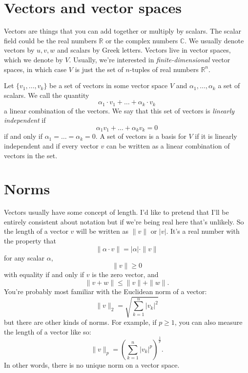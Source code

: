 \documentclass{article}
\theoremstyle{definition}
\theoremstyle{plain}
\begin{document}
\section{Vectors and vector spaces}

Vectors are things that you can add together or multiply by scalars.
The scalar field could be the real numbers $\mathbb{R}$ or the complex numbers $\mathbb{C}$.
We usually denote vectors by $u, v, w$ and scalars by Greek letters.
Vectors live in vector spaces, which we denote by $V$.
Usually, we're interested in \emph{finite-dimensional} vector spaces, in which case $V$ is just the set of $n$-tuples of real numbers $\mathbb{R}^n$.

Let $\{v_1, \ldots, v_k\}$ be a set of vectors in some vector space $V$ and $\alpha_1, \ldots, \alpha_k$ a set of scalars.
We call the quantity
\begin{equation}
    \alpha_1\cdot v_1 + \ldots + \alpha_k\cdot v_k
\end{equation}
a linear combination of the vectors.
We say that this set of vectors is \emph{linearly independent} if
\begin{equation}
    \alpha_1v_1 + \ldots + \alpha_kv_k = 0
\end{equation}
if and only if $\alpha_1 = \ldots = \alpha_k = 0$.
A set of vectors is a basis for $V$ if it is linearly independent and if every vector $v$ can be written as a linear combination of vectors in the set.


\section{Norms}

Vectors usually have some concept of length.
I'd like to pretend that I'll be entirely consistent about notation but if we're being real here that's unlikely.
So the length of a vector $v$ will be written as $\|v\|$ or $|v|$.
It's a real number with the property that
\begin{equation}
    \|\alpha\cdot v\| = |\alpha|\cdot\|v\|
\end{equation}
for any scalar $\alpha$,
\begin{equation}
    \|v\| \ge 0
\end{equation}
with equality if and only if $v$ is the zero vector, and
\begin{equation}
    \|v + w\| \le \|v\| + \|w\|.
\end{equation}
You're probably most familiar with the Euclidean norm of a vector:
\begin{equation}
    \|v\|_2 = \sqrt{\sum_{k = 1}^n|v_k|^2}
\end{equation}
but there are other kinds of norms.
For example, if $p \ge 1$, you can also measure the length of a vector like so:
\begin{equation}
    \|v\|_p = \left(\sum_{k = 1}^n|v_k|^p\right)^{\frac{1}{p}}.
\end{equation}
In other words, there is no unique norm on a vector space.
\end{document}
